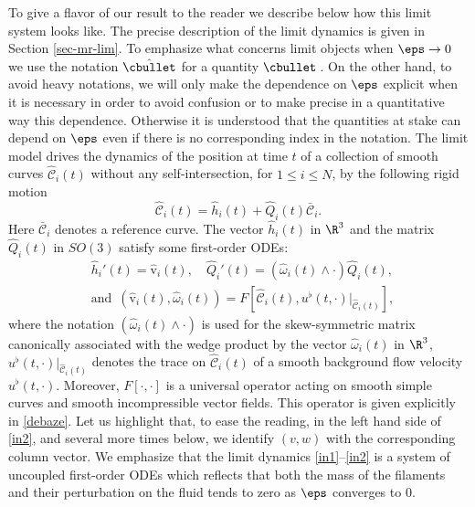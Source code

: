 To give a flavor of our result to the reader we describe below how this limit system looks like.
The precise description of the limit dynamics is given in Section \ref{sec-mr-lim}.
To emphasize what concerns limit objects when $\eps\to 0$
we use the notation $\hat{\cbullet}$ for a quantity~$\!\cbullet\,$. On the other hand,
to avoid heavy notations, we will only {make} the dependence on $\eps$ explicit when it is necessary in order to avoid confusion or to make precise in a quantitative way this dependence.
Otherwise it {is} understood that the quantities at stake {can} depend on $\eps$ even if there is no corresponding index in the notation.
The limit model drives the dynamics of the position at time $t$ of a collection of smooth curves $ \hat{{\mathcal C}}_i(t)$ without any self-intersection, for $ 1\leq i \leq N$, by the following rigid motion
\begin{equation*}
\hat{{\mathcal C}}_i(t) = \hat{h}_i(t) + \hat{Q}_i(t) \bar {\mathcal C}_i.
\end{equation*}
Here $\bar {\mathcal C}_i $ denotes a reference curve.
The vector $\hat{h}_i(t)$ in $\R^3$ and the matrix $\hat{Q}_i(t) $ in $SO(3)$ satisfy some first-order ODEs:
\begin{align} \label{in1}
&\hat{h}_i'(t) = \hat{\textrm{v}}_i (t), \quad
\hat{Q}_i' (t) = (\hat{\omega}_i(t) \wedge \cdot) \hat{Q}_i (t),
\,\\ \label{in2}
&\text{and } \,
(\hat{\textrm{v}}_i(t), \hat{\omega}_i (t)) = F[\hat{{\mathcal C}}_i(t), u^\flat (t,\cdot) \vert_{\hat{{\mathcal C}}_i(t)}],
\end{align}
where the notation $ (\hat{\omega}_i(t) \wedge \cdot)$
is used for the skew-symmetric matrix canonically associated with the wedge product by the vector $\hat{\omega}_i(t)$ in $\R^3$, $u^\flat (t,\cdot) \vert_{\hat{{\mathcal C}}_i(t)}$ denotes the trace on $\hat{{\mathcal C}}_i(t)$ of a smooth
background flow velocity $u^\flat (t,\cdot)$. Moreover, $F[\cdot,\cdot]$ is a universal operator acting on smooth simple curves and smooth incompressible vector fields. This operator is given explicitly in \eqref{debaze}.
Let us highlight that, to ease the reading, in the left hand side of \eqref{in2}, and several more times below,
we identify $(v,w)$ with the corresponding column vector.
We emphasize that the limit dynamics \eqref{in1}--\eqref{in2} is a system of uncoupled first-order ODEs which reflects that both the mass of the filaments and their perturbation on the fluid tends to zero as $\eps$ converges to $ 0$.

